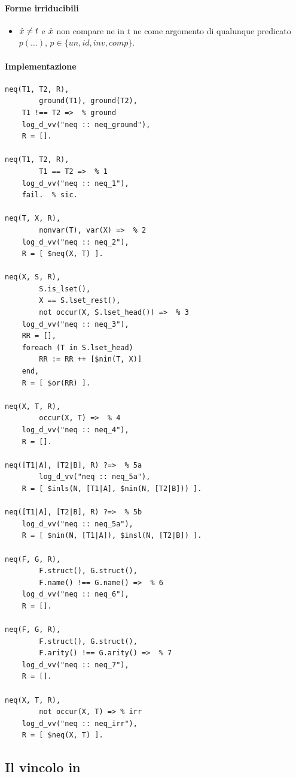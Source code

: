 \documentclass[12pt,a4paper,openright]{book} %
\begin{document}
\paragraph{Forme irriducibili}
\begin{itemize}
	\item $\dot{x} \neq t$ e $\dot{x}$ non compare ne in $t$ ne come argomento di qualunque predicato $p(\ldots)$, $p \in \{ un, id, inv, comp \}$.
\end{itemize}

\paragraph{Implementazione}
\begin{verbatim}
neq(T1, T2, R),
        ground(T1), ground(T2),
    T1 !== T2 =>  % ground
    log_d_vv("neq :: neq_ground"),
    R = [].

neq(T1, T2, R),
        T1 == T2 =>  % 1
    log_d_vv("neq :: neq_1"),
    fail.  % sic.

neq(T, X, R),
        nonvar(T), var(X) =>  % 2
    log_d_vv("neq :: neq_2"),
    R = [ $neq(X, T) ].

neq(X, S, R), 
        S.is_lset(),
        X == S.lset_rest(),
        not occur(X, S.lset_head()) =>  % 3
    log_d_vv("neq :: neq_3"),
    RR = [],
    foreach (T in S.lset_head)
        RR := RR ++ [$nin(T, X)]
    end,
    R = [ $or(RR) ].

neq(X, T, R),
        occur(X, T) =>  % 4
    log_d_vv("neq :: neq_4"),
    R = [].

neq([T1|A], [T2|B], R) ?=>  % 5a
        log_d_vv("neq :: neq_5a"),
    R = [ $inls(N, [T1|A], $nin(N, [T2|B])) ].

neq([T1|A], [T2|B], R) ?=>  % 5b
    log_d_vv("neq :: neq_5a"),
    R = [ $nin(N, [T1|A]), $insl(N, [T2|B]) ].

neq(F, G, R),
        F.struct(), G.struct(),
        F.name() !== G.name() =>  % 6
    log_d_vv("neq :: neq_6"),
    R = [].

neq(F, G, R),
        F.struct(), G.struct(),
        F.arity() !== G.arity() =>  % 7
    log_d_vv("neq :: neq_7"),
    R = [].

neq(X, T, R), 
        not occur(X, T) => % irr
    log_d_vv("neq :: neq_irr"),
    R = [ $neq(X, T) ].
\end{verbatim}

\clearpage

\subsection{Il vincolo in}
\end{document}
